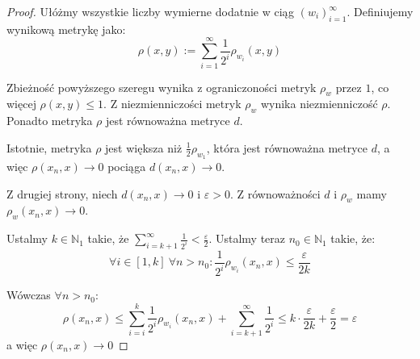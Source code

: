 \begin{thm}
\begin{proof}
    Ułóżmy wszystkie liczby wymierne dodatnie w ciąg $(w_i)_{i=1}^\infty$. Definiujemy wynikową metrykę jako:
    \[\rho(x, y) := \sum_{i=1}^\infty \frac{1}{2^i} \rho_{w_i}(x, y)\]
    
    Zbieżność powyższego szeregu wynika z ograniczoności metryk $\rho_w$ przez $1$, co więcej $\rho(x,y) \leq 1$. Z niezmienniczości metryk $\rho_w$ wynika niezmienniczość $\rho$. Ponadto metryka $\rho$ jest równoważna metryce $d$.
    
    Istotnie, metryka $\rho$ jest większa niż $\frac{1}{2} \rho_{w_1}$, która jest równoważna metryce $d$, a więc $\rho(x_n, x) \to 0$ pociąga $d(x_n, x) \to 0$.
    
    Z drugiej strony, niech $d(x_n, x) \to 0$ i $\varepsilon > 0$. Z równoważności $d$ i $\rho_w$ mamy $\rho_w(x_n, x) \to 0$.
    
    Ustalmy $k \in \mathbb{N}_1$ takie, że $\sum_{i=k+1}^\infty \frac{1}{2^i} < \frac{\varepsilon}{2}$.
    Ustalmy teraz $n_0 \in \mathbb{N}_1$ takie, że:
    \[\forall i \in [1,k]\ \forall n > n_0: \frac{1}{2^i} \rho_{w_i}(x_n, x) \leq \frac{\varepsilon}{2k}\]
    
    Wówczas $\forall n > n_0$:
    \[\rho(x_n, x) \leq \sum_{i=i}^k \frac{1}{2^i} \rho_{w_i}(x_n, x) + \sum_{i=k+1}^\infty \frac{1}{2^i} \leq k \cdot \frac{\varepsilon}{2k} + \frac{\varepsilon}{2} = \varepsilon\]
    a więc $\rho(x_n, x) \to 0$
    

\end{proof}
\end{thm}
